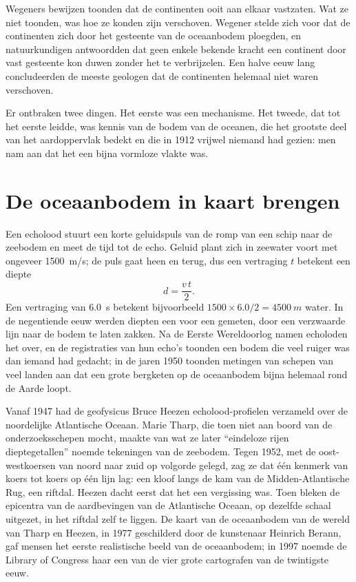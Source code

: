 Wegeners bewijzen toonden dat de continenten ooit aan elkaar vastzaten. Wat ze
niet toonden, was hoe ze konden zijn verschoven. Wegener stelde zich voor dat de
continenten zich door het gesteente van de oceaanbodem ploegden, en natuurkundigen
antwoordden dat geen enkele bekende kracht een continent door vast gesteente kon
duwen zonder het te verbrijzelen. Een halve eeuw lang concludeerden de meeste
geologen dat de continenten helemaal niet waren verschoven.

Er ontbraken twee dingen. Het eerste was een mechanisme. Het tweede, dat tot het
eerste leidde, was kennis van de bodem van de oceanen, die het grootste deel van
het aardoppervlak bedekt en die in 1912 vrijwel niemand had gezien: men nam aan
dat het een bijna vormloze vlakte was.

\section{De oceaanbodem in kaart brengen}

Een echolood stuurt een korte geluidspuls van de romp van een schip naar de
zeebodem en meet de tijd tot de echo. Geluid plant zich in zeewater voort met
ongeveer \qty{1500}{m/s}; de puls gaat heen en terug, dus een vertraging $t$
betekent een diepte
\[
  d = \frac{v\,t}{2}.
\]
Een vertraging van \qty{6.0}{s} betekent bijvoorbeeld $1500 \times 6.0/2 =
\qty{4500}{m}$ water. In de negentiende eeuw werden diepten een voor een gemeten,
door een verzwaarde lijn naar de bodem te laten zakken. Na de Eerste
Wereldoorlog namen echoloden het over, en de registraties van hun echo's toonden
een bodem die veel ruiger was dan iemand had gedacht; in de jaren 1950 toonden
metingen van schepen van veel landen aan dat een grote bergketen op de oceaanbodem
bijna helemaal rond de Aarde loopt.

\begin{history}
Vanaf 1947 had de geofysicus Bruce Heezen echolood-profielen verzameld over de
noordelijke Atlantische Oceaan. Marie Tharp, die toen niet aan boord van de
onderzoeksschepen mocht, maakte van wat ze later ``eindeloze rijen
dieptegetallen'' noemde tekeningen van de zeebodem. Tegen 1952, met de
oost-westkoersen van noord naar zuid op volgorde gelegd, zag ze dat één kenmerk
van koers tot koers op één lijn lag: een kloof langs de kam van de Midden-Atlantische
Rug, een riftdal. Heezen dacht eerst dat het een vergissing was. Toen bleken de
epicentra van de aardbevingen van de Atlantische Oceaan, op dezelfde schaal
uitgezet, in het riftdal zelf te liggen. De kaart van de oceaanbodem van de
wereld van Tharp en Heezen, in 1977 geschilderd door de kunstenaar Heinrich
Berann, gaf mensen het eerste realistische beeld van de oceaanbodem; in 1997
noemde de Library of Congress haar een van de vier grote cartografen van de
twintigste eeuw.
\end{history}

